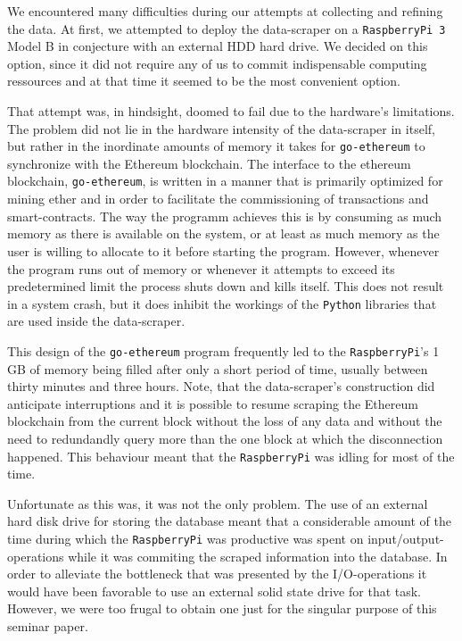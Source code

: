 We encountered many difficulties during our attempts at collecting and refining the data. 
At first, we attempted to deploy the data-scraper on a \texttt{RaspberryPi 3} Model B in conjecture with an external HDD hard drive. 
We decided on this option, since it did not require any of us to commit indispensable computing ressources and at that time it seemed to be the most convenient option.

That attempt was, in hindsight, doomed to fail due to the hardware's limitations. 
The problem did not lie in the hardware intensity of the data-scraper in itself, but rather in the inordinate amounts of memory it takes for \texttt{go-ethereum} to synchronize with the Ethereum blockchain. 
The interface to the ethereum blockchain, \texttt{go-ethereum}, is written in a manner that is primarily optimized for mining ether and in order to facilitate the commissioning of transactions and smart-contracts. 
The way the programm achieves this is by consuming as much memory as there is available on the system, or at least as much memory as the user is willing to allocate to it before starting the program. 
However, whenever the program runs out of memory or whenever it attempts to exceed its predetermined limit the process shuts down and kills itself. 
This does not result in a system crash, but it does inhibit the workings of the \texttt{Python} libraries that are used inside the data-scraper.

This design of the \texttt{go-ethereum} program frequently led to the \texttt{RaspberryPi}'s 1 GB of memory being filled after only a short period of time, usually between thirty minutes and three hours. 
Note, that the data-scraper's construction did anticipate interruptions and it is possible to resume scraping the Ethereum blockchain from the current block without the loss of any data and without the need to redundandly query more than the one block at which the disconnection happened. 
This behaviour meant that the \texttt{RaspberryPi} was idling for most of the time.

Unfortunate as this was, it was not the only problem. 
The use of an external hard disk drive for storing the database meant that a considerable amount of the time during which the \texttt{RaspberryPi} was productive was spent on input/output-operations while it was commiting the scraped information into the database. 
In order to alleviate the bottleneck that was presented by the I/O-operations it would have been favorable to use an external solid state drive for that task. 
However, we were too frugal to obtain one just for the singular purpose of this seminar paper.

